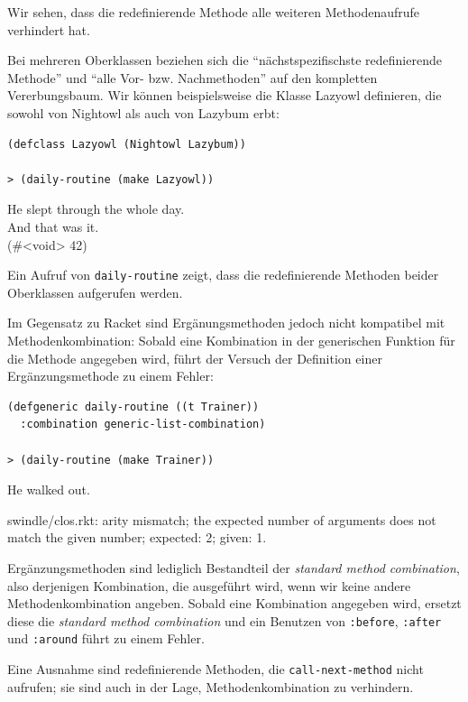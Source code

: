 Wir sehen, dass die redefinierende Methode alle weiteren Methodenaufrufe verhindert hat. 

Bei mehreren Oberklassen beziehen sich die ``nächstspezifischste redefinierende Methode'' und ``alle Vor- bzw. Nachmethoden'' auf den kompletten Vererbungsbaum. Wir können beispielsweise die Klasse Lazyowl definieren, die sowohl von Nightowl als auch von Lazybum erbt:

\begin{lstlisting}
(defclass Lazyowl (Nightowl Lazybum))

> (daily-routine (make Lazyowl))
\end{lstlisting}
{\routput He slept through the whole day.\\
\phantom{.}And that was it.\\
\phantom{.}(\#<void> 42)}

Ein Aufruf von \texttt{daily-routine} zeigt, dass die redefinierende Methoden beider Oberklassen aufgerufen werden. 

Im Gegensatz zu Racket sind Ergänungsmethoden jedoch nicht kompatibel mit Methodenkombination: Sobald eine Kombination in der generischen Funktion für die Methode angegeben wird, führt der Versuch der Definition einer Ergänzungsmethode zu einem Fehler:

\begin{lstlisting}
(defgeneric daily-routine ((t Trainer))
  :combination generic-list-combination)
  
> (daily-routine (make Trainer))
\end{lstlisting}
{\routput He walked out.}

\vspace{-0.3cm}
{\rerror swindle/clos.rkt: arity mismatch; the expected number of arguments does not match the given number; expected: 2; given: 1.}

Ergänzungsmethoden sind lediglich Bestandteil der \emph{standard method combination}, also derjenigen Kombination, die ausgeführt wird, wenn wir keine andere Methodenkombination angeben. Sobald eine Kombination angegeben wird, ersetzt diese die \textit{standard method combination} und ein Benutzen von \texttt{:before}, \texttt{:after} und \texttt{:around} führt zu einem Fehler.

Eine Ausnahme sind redefinierende Methoden, die \texttt{call-next-method} nicht aufrufen; sie sind auch in der Lage, Methodenkombination zu verhindern.

